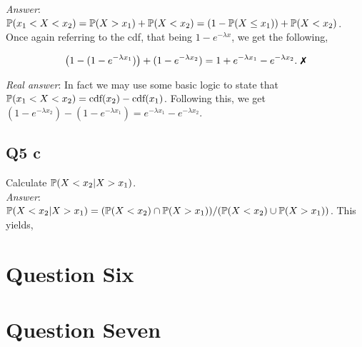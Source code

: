 \documentclass{article}
\begin{document}
            \textit{Answer}: $\mathbb{P}(x_1 < X < x_2) = \mathbb{P}(X > x_1) + \mathbb{P}(X < x_2) = (1-\mathbb{P}(X \leq x_1)) + \mathbb{P}(X < x_2)$.\\

            Once again referring to the cdf, that being $1 - e^{-\lambda x}$, we get the following,

            \[\left( 1 - (1 - e^{-\lambda x_1}) \right) + (1 - e^{-\lambda x_2}) = 1 + e^{-\lambda x_1} - e^{-\lambda x_2}.~\xmark\]

            \textit{Real answer}: In fact we may use some basic logic to state that $\mathbb{P}(x_1 < X < x_2) = \text{cdf}(x_2) - \text{cdf}(x_1)$. Following this, we get $(1 - e^{-\lambda x_2}) - (1 - e^{-\lambda x_1}) = e^{-\lambda x_1} - e^{-\lambda x_2}$.

        \subsection{Q5 c}
            Calculate $\mathbb{P}(X < x_2 | X > x_1)$.\\

            \textit{Answer}: $\mathbb{P}(X < x_2 | X > x_1) = (\mathbb{P}(X < x_2)\cap \mathbb{P}(X > x_1))/(\mathbb{P}(X < x_2) \cup \mathbb{P}(X > x_1))$. This yields, 

    \section{Question Six}

    \section{Question Seven}
\end{document}
